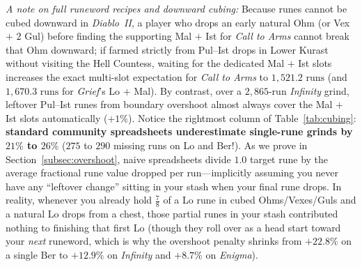 \documentclass[11pt,reqno]{amsart}
\theoremstyle{definition}
\begin{document}
\noindent\emph{A note on full runeword recipes and downward cubing:} Because runes cannot be cubed downward in \emph{Diablo~II}, a player who drops an early natural Ohm (or Vex $+$ $2\text{ Gul}$) before finding the supporting Mal $+$ Ist for \emph{Call to Arms} cannot break that Ohm downward; if farmed strictly from Pul--Ist drops in Lower Kurast without visiting the Hell Countess, waiting for the dedicated Mal $+$ Ist slots increases the exact multi-slot expectation for \emph{Call to Arms} to $1{,}521.2\text{ runs}$ (and $1{,}670.3\text{ runs}$ for \emph{Grief}'s Lo $+$ Mal). By contrast, over a $2{,}865$-run \emph{Infinity} grind, leftover Pul--Ist runes from boundary overshoot almost always cover the Mal $+$ Ist slots automatically ($+1\%$).
Notice the rightmost column of Table~\ref{tab:cubing}: \textbf{standard community spreadsheets underestimate single-rune grinds by $21\%$ to $26\%$} ($275$ to $290$ missing runs on Lo and Ber!). As we prove in Section~\ref{subsec:overshoot}, naive spreadsheets divide $1.0$ target rune by the average fractional rune value dropped per run—implicitly assuming you never have any ``leftover change'' sitting in your stash when your final rune drops. In reality, whenever you already hold $\frac{7}{8}$ of a Lo rune in cubed Ohms/Vexes/Guls and a natural Lo drops from a chest, those partial runes in your stash contributed nothing to finishing that first Lo (though they roll over as a head start toward your \emph{next} runeword, which is why the overshoot penalty shrinks from $+22.8\%$ on a single Ber to $+12.9\%$ on \emph{Infinity} and $+8.7\%$ on \emph{Enigma}).
\end{document}
